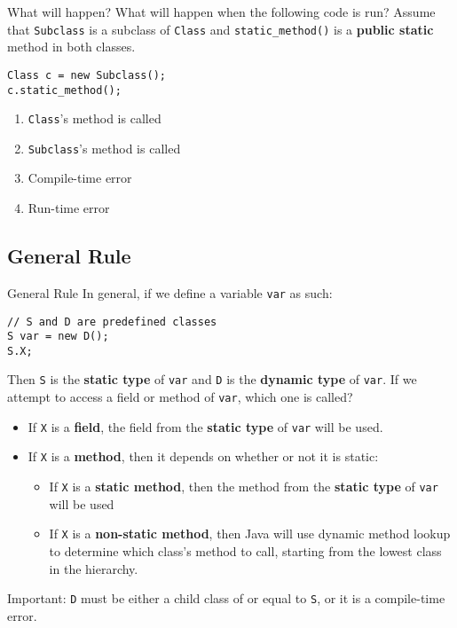 \documentclass[9pt]{beamer}
\begin{document}
\begin{frame}[fragile]{What will happen?}
  What will happen when the following code is run? Assume that {\tt Subclass} is
  a subclass of {\tt Class} and {\tt static\_method()} is a {\bf public static} method
  in both classes.
  \begin{lstlisting}
Class c = new Subclass();
c.static_method();
  \end{lstlisting}
  \begin{enumerate}
    \item
      \alert<2>{{\tt Class}'s method is called}
    \item
      {\tt Subclass}'s method is called
    \item
      Compile-time error
    \item
      Run-time error
  \end{enumerate}
\end{frame}

\subsection{General Rule}
\begin{frame}[fragile]{General Rule}
  In general, if we define a variable {\tt var} as such:
  \begin{lstlisting}
// S and D are predefined classes
S var = new D();
S.X;
  \end{lstlisting}
  Then {\tt S} is the {\bf static type} of {\tt var} and {\tt D} is the {\bf
  dynamic type} of {\tt var}. If we attempt to access a field or method of
  {\tt var}, which one is called?
  \begin{itemize}
    \item
      If {\tt X} is a {\bf field}, the field from the {\bf static type} of
      {\tt var} will be used.
    \item
      If {\tt X} is a {\bf method}, then it depends on whether or not it is
      static:
      \begin{itemize}
        \item
          If {\tt X} is a {\bf static method}, then the method from the {\bf
          static type} of {\tt var} will be used
        \item
          If {\tt X} is a {\bf non-static method}, then Java will use
          dynamic method lookup to determine which class's method to call,
          starting from the lowest class in the hierarchy.
      \end{itemize}
  \end{itemize}
  \begin{framed}
    Important: {\tt D} must be either a child class of or equal to {\tt S},
    or it is a compile-time error.
  \end{framed}
\end{frame}
\end{document}
